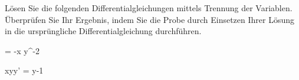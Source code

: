 \begin{atiTask}[
	title = Zwei separable Differentialgleichungen,
	language = Deutsch
]
	Lösen Sie die folgenden Differentialgleichungen mittels Trennung der Variablen.
	Überprüfen Sie Ihr Ergebnis, indem Sie die Probe durch Einsetzen Ihrer Lösung in die ursprüngliche Differentialgleichung durchführen.
	\begin{atiSubequations}
		\item{
			 = -\tan x \cdot y^{-2}
		}
		\item{
			xyy' = y-1
		}
	\end{atiSubequations}
\end{atiTask}